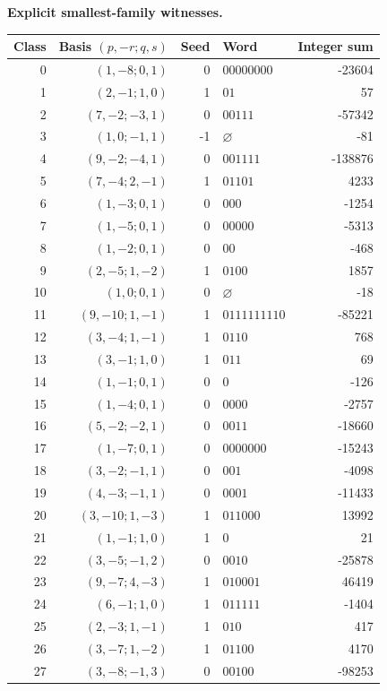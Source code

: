 \par\medskip\noindent\textbf{Explicit smallest-family witnesses.}
\begin{longtable}{r r r l r}
Class & Basis $(p,-r;q,s)$ & Seed & Word & Integer sum\\\hline
0 & $(1,-8;0,1)$ & 0 & $00000000$ & -23604\\
1 & $(2,-1;1,0)$ & 1 & $01$ & 57\\
2 & $(7,-2;-3,1)$ & 0 & $00111$ & -57342\\
3 & $(1,0;-1,1)$ & -1 & $\varnothing$ & -81\\
4 & $(9,-2;-4,1)$ & 0 & $001111$ & -138876\\
5 & $(7,-4;2,-1)$ & 1 & $01101$ & 4233\\
6 & $(1,-3;0,1)$ & 0 & $000$ & -1254\\
7 & $(1,-5;0,1)$ & 0 & $00000$ & -5313\\
8 & $(1,-2;0,1)$ & 0 & $00$ & -468\\
9 & $(2,-5;1,-2)$ & 1 & $0100$ & 1857\\
10 & $(1,0;0,1)$ & 0 & $\varnothing$ & -18\\
11 & $(9,-10;1,-1)$ & 1 & $0111111110$ & -85221\\
12 & $(3,-4;1,-1)$ & 1 & $0110$ & 768\\
13 & $(3,-1;1,0)$ & 1 & $011$ & 69\\
14 & $(1,-1;0,1)$ & 0 & $0$ & -126\\
15 & $(1,-4;0,1)$ & 0 & $0000$ & -2757\\
16 & $(5,-2;-2,1)$ & 0 & $0011$ & -18660\\
17 & $(1,-7;0,1)$ & 0 & $0000000$ & -15243\\
18 & $(3,-2;-1,1)$ & 0 & $001$ & -4098\\
19 & $(4,-3;-1,1)$ & 0 & $0001$ & -11433\\
20 & $(3,-10;1,-3)$ & 1 & $011000$ & 13992\\
21 & $(1,-1;1,0)$ & 1 & $0$ & 21\\
22 & $(3,-5;-1,2)$ & 0 & $0010$ & -25878\\
23 & $(9,-7;4,-3)$ & 1 & $010001$ & 46419\\
24 & $(6,-1;1,0)$ & 1 & $011111$ & -1404\\
25 & $(2,-3;1,-1)$ & 1 & $010$ & 417\\
26 & $(3,-7;1,-2)$ & 1 & $01100$ & 4170\\
27 & $(3,-8;-1,3)$ & 0 & $00100$ & -98253\\
\end{longtable}
